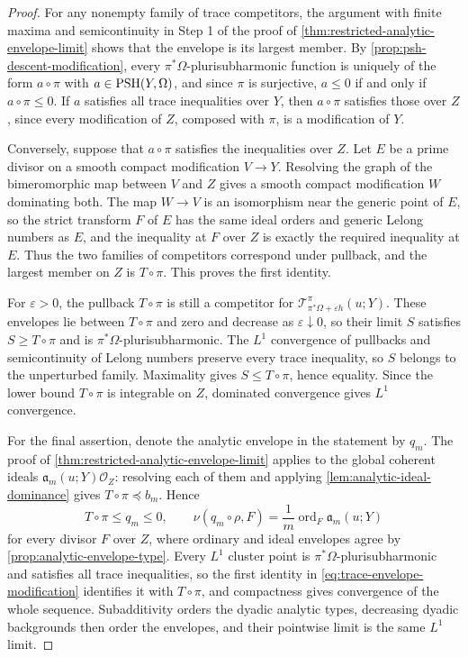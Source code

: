 \begin{proof}
For any nonempty family of trace competitors, the argument with finite maxima and semicontinuity in Step 1 of the proof of \cref{thm:restricted-analytic-envelope-limit} shows that the envelope is its largest member. By \cref{prop:psh-descent-modification}, every $\pi^*\Omega$-plurisubharmonic function is uniquely of the form $a\circ\pi$ with $a\in\mathrm{PSH}(Y,\Omega)$, and since $\pi$ is surjective, $a\leq0$ if and only if $a\circ\pi\leq0$. If $a$ satisfies all trace inequalities over $Y$, then $a\circ\pi$ satisfies those over $Z$, since every modification of $Z$, composed with $\pi$, is a modification of $Y$.

Conversely, suppose that $a\circ\pi$ satisfies the inequalities over $Z$. Let $E$ be a prime divisor on a smooth compact modification $V\to Y$. Resolving the graph of the bimeromorphic map between $V$ and $Z$ gives a smooth compact modification $W$ dominating both. The map $W\to V$ is an isomorphism near the generic point of $E$, so the strict transform $F$ of $E$ has the same ideal orders and generic Lelong numbers as $E$, and the inequality at $F$ over $Z$ is exactly the required inequality at $E$. Thus the two families of competitors correspond under pullback, and the largest member on $Z$ is $T\circ\pi$. This proves the first identity.

For $\varepsilon>0$, the pullback $T\circ\pi$ is still a competitor for $\mathcal T^\pi_{\pi^*\Omega+\varepsilon h}(u;Y)$. These envelopes lie between $T\circ\pi$ and zero and decrease as $\varepsilon\downarrow0$, so their limit $S$ satisfies $S\geq T\circ\pi$ and is $\pi^*\Omega$-plurisubharmonic. The $L^1$ convergence of pullbacks and semicontinuity of Lelong numbers preserve every trace inequality, so $S$ belongs to the unperturbed family. Maximality gives $S\leq T\circ\pi$, hence equality. Since the lower bound $T\circ\pi$ is integrable on $Z$, dominated convergence gives $L^1$ convergence.

For the final assertion, denote the analytic envelope in the statement by $q_m$. The proof of \cref{thm:restricted-analytic-envelope-limit} applies to the global coherent ideals $\mathfrak a_m(u;Y)\mathcal O_Z$: resolving each of them and applying \cref{lem:analytic-ideal-dominance} gives $T\circ\pi\preceq b_m$. Hence
\[
 T\circ\pi\leq q_m\leq0,\qquad
 \nu(q_m\circ\rho,F)
 =\frac1m\operatorname{ord}_F\mathfrak a_m(u;Y)
\]
for every divisor $F$ over $Z$, where ordinary and ideal envelopes agree by \cref{prop:analytic-envelope-type}. Every $L^1$ cluster point is $\pi^*\Omega$-plurisubharmonic and satisfies all trace inequalities, so the first identity in \eqref{eq:trace-envelope-modification} identifies it with $T\circ\pi$, and compactness gives convergence of the whole sequence. Subadditivity orders the dyadic analytic types, decreasing dyadic backgrounds then order the envelopes, and their pointwise limit is the same $L^1$ limit.
\end{proof}

